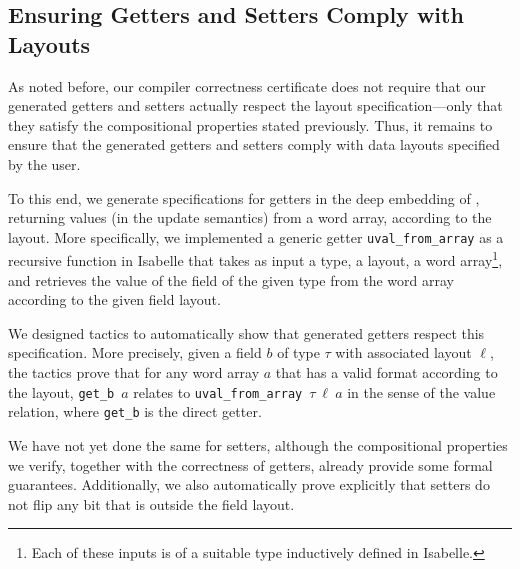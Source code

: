 \subsection{Ensuring Getters and Setters Comply with Layouts}
\label{ss:sanity-checks}

As noted before, our compiler correctness certificate
does not require that our generated getters and setters actually respect the layout specification---only that they satisfy the compositional properties stated previously.
Thus, it remains to ensure that the generated getters and setters comply with data layouts specified by the user.

To this end, we  generate specifications for getters in the deep embedding of \cogent,
returning \cogent values (in the update semantics) from a word array,
according to the layout.
More specifically, we implemented a
generic getter \lstinline|uval_from_array|
as a recursive function in Isabelle that takes as input a \cogent type, a
\Dargent layout,
a word array\footnote{Each of these inputs is of a suitable type inductively
  defined in Isabelle.},
and retrieves the value of the field of the given
\cogent type from the word array according to the given field layout.



We designed tactics to automatically show that generated getters respect this
specification. More precisely, given a field $b$ of \cogent type $\tau$ with associated layout
$\ell$, the tactics
prove that for any word array $a$ that has a valid
format according to the layout, \lstinline|get_b|~$a$
relates to \lstinline|uval_from_array|~$\tau\ \ell\ a$ in the sense of the value
relation,
 where \lstinline|get_b| is the 
direct getter.

We have not yet done the same for setters, although the compositional properties we verify,
together with the correctness of getters, already provide some formal guarantees. Additionally, we also automatically prove explicitly that
setters do not flip any bit that is outside the field layout. 


